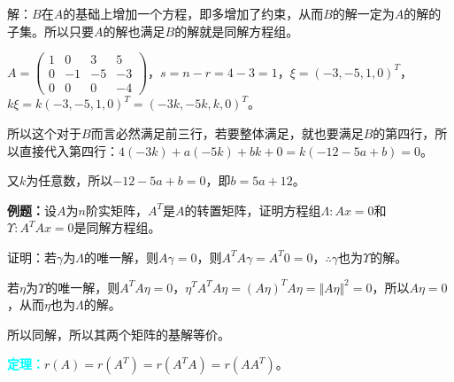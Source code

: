 \documentclass[UTF8, 12pt]{ctexart}
\begin{document}
解：$B$在$A$的基础上增加一个方程，即多增加了约束，从而$B$的解一定为$A$的解的子集。所以只要$A$的解也满足$B$的解就是同解方程组。

$A=\left(\begin{array}{cccc}
    1 & 0 & 3 & 5 \\
    0 & -1 & -5 & -3 \\
    0 & 0 & 0 & -4
\end{array}\right)$，$s=n-r=4-3=1$，$\xi=(-3,-5,1,0)^T$，$k\xi=k(-3,-5,1,0)^T=(-3k,-5k,k,0)^T$。

所以这个对于$B$而言必然满足前三行，若要整体满足，就也要满足$B$的第四行，所以直接代入第四行：$4(-3k)+a(-5k)+bk+0=k(-12-5a+b)=0$。

又$k$为任意数，所以$-12-5a+b=0$，即$b=5a+12$。

\textbf{例题：}设$A$为$n$阶实矩阵，$A^T$是$A$的转置矩阵，证明方程组$\Lambda:Ax=0$和$\Upsilon:A^TAx=0$是同解方程组。

证明：若$\gamma$为$\Lambda$的唯一解，则$A\gamma=0$，则$A^TA\gamma=A^T0=0$，$\therefore\gamma$也为$\Upsilon$的解。

若$\eta$为$\Upsilon$的唯一解，则$A^TA\eta=0$，$\eta^TA^TA\eta=(A\eta)^TA\eta=\Vert A\eta\Vert^2=0$，所以$A\eta=0$，从而$\eta$也为$\Lambda$的解。

所以同解，所以其两个矩阵的基解等价。

\textcolor{aqua}{\textbf{定理：}}$r(A)=r(A^T)=r(A^TA)=r(AA^T)$。
\end{document}
